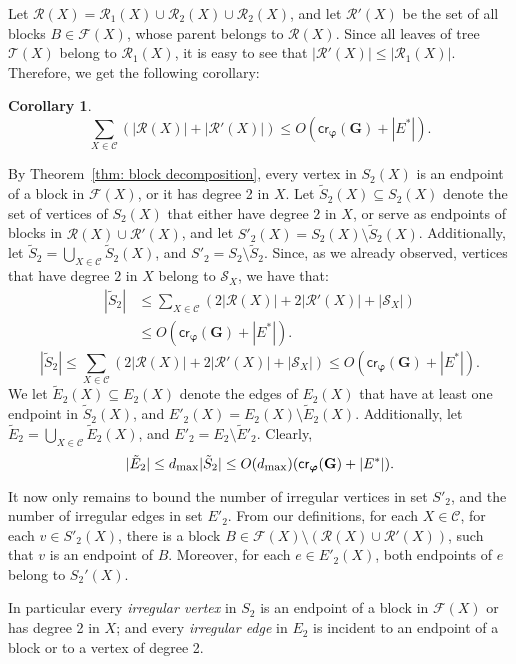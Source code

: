 \documentclass[twoside,leqno,twocolumn]{article}
\newcommand{\sse}{\subseteq}
\newcommand{\tset}{{\mathcal T}}
\newcommand{\cset}{{\mathcal{C}}}
\newcommand{\fset}{{\mathcal{F}}}
\newcommand{\rset}{{\mathcal{R}}}
\newcommand{\sset}{{\mathcal{S}}}
\newtheorem{corollary}{Corollary}
\newcommand{\cro}{\mathsf{cr}}
\newcommand{\dmax}{d_{\mbox{\textup{\footnotesize{max}}}}}
\newcommand{\G}{{\mathbf{G}}}
\newcommand{\bphi}{{\boldsymbol{\varphi}}}
\begin{document}
Let $\rset(X)=\rset_1(X)\cup \rset_2(X)\cup \rset_2(X)$, and let
$\rset'(X)$ be the set of all blocks $B\in \fset(X)$, whose parent belongs to $\rset(X)$.
Since all leaves of tree $\tset(X)$ belong to $\rset_1(X)$, it is easy to see that $|\rset'(X)|\leq |\rset_1(X)|$.
Therefore, we get the following corollary:

\begin{corollary}\label{corollary: sizes of R's}
$$\sum_{X\in\cset}( |\rset(X)|+|\rset'(X)|)\leq O(\cro_{\bphi}(\G) + |E^*|).$$
\end{corollary}

By Theorem~\ref{thm: block decomposition}, every vertex in $S_2(X)$ is an endpoint of 
a block in $\fset(X)$, or it has degree 2 in $X$. 
Let $\tilde{S}_2(X)\sse S_2(X)$ denote the set of vertices of $S_2(X)$ that either have degree $2$ in $X$, or serve as endpoints of blocks in $\rset(X)\cup \rset'(X)$, and let $S'_2(X)=S_2(X)\setminus \tilde{S}_2(X)$. Additionally, let $\tilde{S}_2=\bigcup_{X\in\cset}\tilde{S}_2(X)$, and $S'_2=S_2\setminus\tilde{S}_2$. Since, as we already observed, vertices that have degree $2$ in $X$ belong to $\sset_X$, we have that: 
\ifabstract
\begin{align*}
|\tilde{S}_2| &\leq \sum_{X\in \cset}(2|\rset(X)|+2|\rset'(X)|+|\sset_X|)\\
&\leq O(\cro_{\bphi}(\G) + |E^*|).
\end{align*}
\fi\iffull
$$
|\tilde{S}_2| \leq \sum_{X\in \cset}(2|\rset(X)|+2|\rset'(X)|+|\sset_X|) \leq O(\cro_{\bphi}(\G) + |E^*|).
$$
\fi We let $\tilde{E}_2(X)\sse E_2(X)$ denote the edges of $E_2(X)$ that have at least one endpoint in $\tilde{S}_2(X)$, and $E'_2(X)=E_2(X)\setminus \tilde{E}_2(X)$. Additionally, let $\tilde{E}_2=\bigcup_{X\in\cset}\tilde{E}_2(X)$, and $E'_2=E_2\setminus \tilde{E}'_2$. Clearly,
\[|\tilde{E}_2|\leq \dmax|\tilde{S}_2|\leq O(\dmax)(\cro_{\bphi}(\G) + |E^*|).\]

It now only remains to bound the number of irregular vertices in set $S'_2$, and the number of irregular edges in set $E'_2$. From our definitions,  for each $X\in \cset$, for each $v\in S'_2(X)$, there is a block $B\in \fset(X)\setminus (\rset(X)\cup \rset'(X))$, such that $v$ is an endpoint of $B$. Moreover, for each $e\in E'_2(X)$, both endpoints of $e$ belong to $S_2'(X)$.


\iffalse
In particular every \textit{irregular vertex} in $S_2$ is an endpoint
of a block in $\fset(X)$ or has degree 2 in $X$;
and every \textit{irregular edge} in $E_2$ is incident to an endpoint of a block or to 
a vertex of degree 2.
\end{document}
